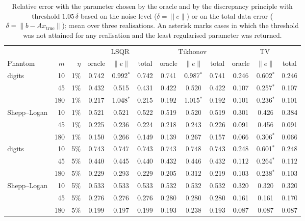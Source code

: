 \documentclass[11pt,a4paper]{article}
\numberwithin{equation}{section}
\theoremstyle{remark}
\newcommand{\xt}{x_{\mathrm{true}}}
\begin{document}
\begin{table}[t]
\centering
\caption{Relative error with the parameter chosen by the oracle and by the discrepancy principle with threshold $1.05\,\delta$ based on the noise level ($\delta=\|e\|$) or on the total data error ($\delta=\|b-A\xt\|$); mean over three realisations. An asterisk marks cases in which the threshold was not attained for any realisation and the least regularised parameter was returned.}\label{tab:discrepancy}
\small
\setlength{\tabcolsep}{4pt}
\begin{tabular}{lrr ccc ccc ccc}
\toprule
 & & & \multicolumn{3}{c}{LSQR} & \multicolumn{3}{c}{Tikhonov} & \multicolumn{3}{c}{TV} \\
\cmidrule(lr){4-6}\cmidrule(lr){7-9}\cmidrule(lr){10-12}
Phantom & $m$ & $\eta$ & oracle & $\|e\|$ & total & oracle & $\|e\|$ & total & oracle & $\|e\|$ & total \\
\midrule
digits & 10 & 1\% & 0.742 & 0.992$^\ast$ & 0.742 & 0.741 & 0.987$^\ast$ & 0.741 & 0.246 & 0.602$^\ast$ & 0.246 \\
 & 45 & 1\% & 0.432 & 0.515 & 0.431 & 0.422 & 0.520 & 0.422 & 0.107 & 0.257$^\ast$ & 0.107 \\
 & 180 & 1\% & 0.217 & 1.048$^\ast$ & 0.215 & 0.192 & 1.015$^\ast$ & 0.192 & 0.101 & 0.236$^\ast$ & 0.101 \\
Shepp--Logan & 10 & 1\% & 0.521 & 0.521 & 0.522 & 0.519 & 0.520 & 0.519 & 0.301 & 0.426 & 0.384 \\
 & 45 & 1\% & 0.225 & 0.236 & 0.224 & 0.218 & 0.243 & 0.226 & 0.091 & 0.456 & 0.091 \\
 & 180 & 1\% & 0.150 & 0.266 & 0.149 & 0.139 & 0.267 & 0.157 & 0.066 & 0.306$^\ast$ & 0.066 \\
\midrule
digits & 10 & 5\% & 0.743 & 0.747 & 0.743 & 0.743 & 0.748 & 0.743 & 0.248 & 0.601$^\ast$ & 0.248 \\
 & 45 & 5\% & 0.440 & 0.445 & 0.440 & 0.432 & 0.446 & 0.432 & 0.112 & 0.264$^\ast$ & 0.112 \\
 & 180 & 5\% & 0.229 & 0.293 & 0.229 & 0.205 & 0.312 & 0.219 & 0.103 & 0.238$^\ast$ & 0.103 \\
Shepp--Logan & 10 & 5\% & 0.533 & 0.533 & 0.533 & 0.532 & 0.532 & 0.532 & 0.320 & 0.320 & 0.320 \\
 & 45 & 5\% & 0.276 & 0.276 & 0.276 & 0.280 & 0.280 & 0.280 & 0.161 & 0.161 & 0.170 \\
 & 180 & 5\% & 0.199 & 0.197 & 0.199 & 0.193 & 0.238 & 0.193 & 0.087 & 0.087 & 0.087 \\
\bottomrule
\end{tabular}
\end{table}
\end{document}
